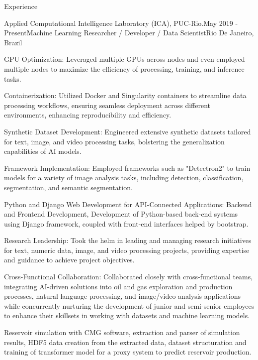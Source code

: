 \documentclass{resume} %
\begin{document}
\begin{rSection}{Experience}
\begin{rSubsection}{Applied Computational Intelligence Laboratory (ICA), PUC-Rio.}{May  2019 - Present}{Machine Learning Researcher / Developer / Data Scientist}{Rio De Janeiro, Brazil}
{            \item GPU Optimization: Leveraged multiple GPUs across nodes and even employed multiple nodes to maximize the efficiency of processing, training, and inference tasks.
            \item Containerization: Utilized Docker and Singularity containers to streamline data processing workflows, ensuring seamless deployment across different environments, enhancing reproducibility and efficiency.
            \item Synthetic Dataset Development: Engineered extensive synthetic datasets tailored for text, image, and video processing tasks, bolstering the generalization capabilities of AI models.
            \item Framework Implementation: Employed frameworks such as "Detectron2" to train models for a variety of image analysis tasks, including detection, classification, segmentation, and semantic segmentation.
            \item Python and Django Web Development for API-Connected Applications: Backend and Frontend Development, Development of Python-based back-end systems using Django framework, coupled with front-end interfaces helped by bootstrap.
            \item Research Leadership: Took the helm in leading and managing research initiatives for text, numeric data, image, and video processing projects, providing expertise and guidance to achieve project objectives.
            \item Cross-Functional Collaboration: Collaborated closely with cross-functional teams, integrating AI-driven solutions into oil and gas exploration and production processes, natural language processing, and image/video analysis applications while concurrently nurturing the development of junior and semi-senior employees to enhance their skillsets in working with datasets and machine learning models.
            \item Reservoir simulation with CMG software, extraction and parser of simulation results, HDF5 data creation from the extracted data, dataset structuration and training of transformer model for a proxy system to predict reservoir production.
            }
        \end{rSubsection}


\end{rSection}
\end{document}
